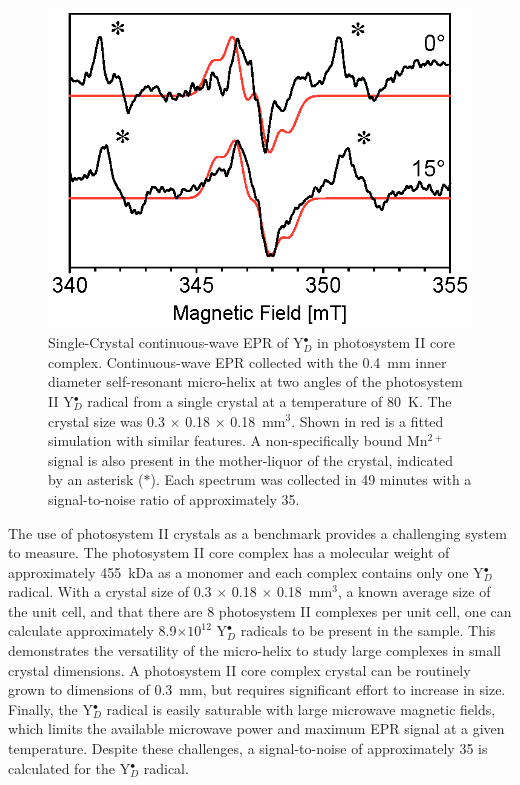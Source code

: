 \begin{figure}[htbp]
\centering
 \includegraphics{Kapitel/Ch4-Images/03-PSII-xTal-Data.eps}
 \caption[Single-Crystal CW EPR of Y$_D^\bullet$ in photosystem II core complex.]{Single-Crystal continuous-wave EPR of Y$_D^\bullet$ in photosystem II core complex. Continuous-wave EPR collected with the 0.4~mm inner diameter self-resonant micro-helix at two angles of the photosystem II Y$_D^\bullet$ radical from a single crystal at a temperature of 80~K. The crystal size was 0.3 $\times$ 0.18 $\times$ 0.18~mm$^3$. Shown in red is a fitted simulation with similar features. A non-specifically bound Mn$^{2+}$ signal is also present in the mother-liquor of the crystal, indicated by an asterisk (\mbox{\large $\ast$}). Each spectrum was collected in 49 minutes with a signal-to-noise ratio of approximately 35.}
 \label{fig:xTalPSII}
\end{figure}

The use of photosystem II crystals as a benchmark provides a challenging system to measure. The photosystem II core complex has a molecular weight of approximately 455~kDa as a monomer and each complex contains only one Y$_D^\bullet$ radical. With a crystal size of 0.3 $\times$ 0.18 $\times$ 0.18~mm$^3$, a known average size of the unit cell, and that there are 8 photosystem II complexes per unit cell, one can calculate approximately 8.9$\times10^{12}$ Y$_D^\bullet$ radicals to be present in the sample. This demonstrates the versatility of the micro-helix to study large complexes in small crystal dimensions. A photosystem II core complex crystal can be routinely grown to dimensions of 0.3~mm, but requires significant effort to increase in size. Finally, the Y$_D^\bullet$ radical is easily saturable with large microwave magnetic fields, which limits the available microwave power and maximum EPR signal at a given temperature. Despite these challenges, a signal-to-noise of approximately 35 is calculated for the Y$_D^\bullet$ radical. 

